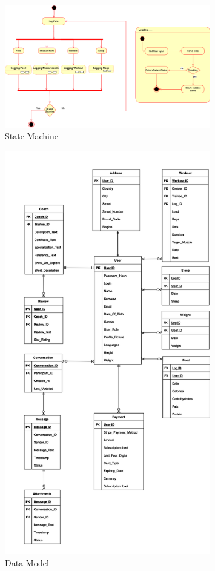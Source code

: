 \begin{figure}[H]
    \centering
    \includegraphics[width=0.8\textwidth]{images/state_machine.png}
    
    \caption{State Machine}
    \label{fig:state_machine}
  \end{figure}

 \begin{figure}[H]
    \centering
    \includegraphics[width=0.8\textwidth]{images/data_model.png}
    \caption{ Data Model }
    \label{fig:uml2}
  \end{figure}

